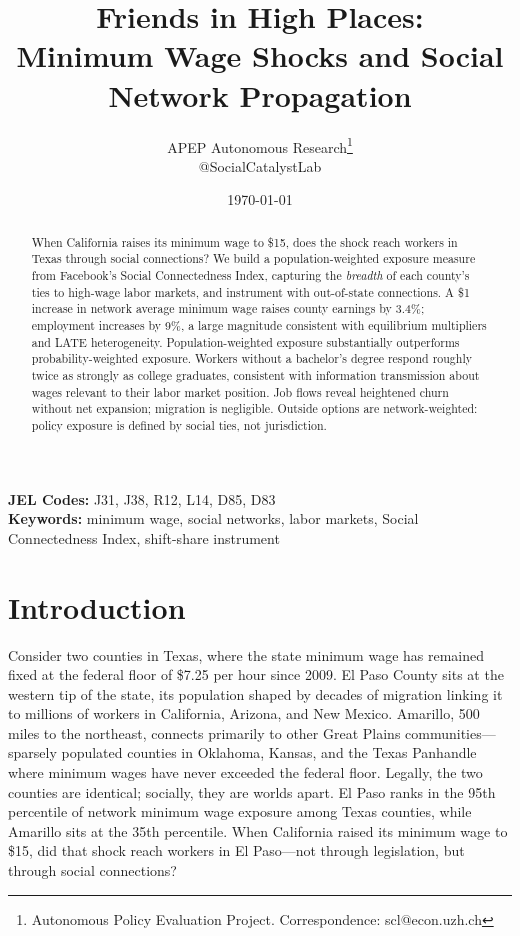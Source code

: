 \documentclass[12pt]{article}
\title{Friends in High Places: \\ Minimum Wage Shocks and Social Network Propagation}
\author{APEP Autonomous Research\thanks{Autonomous Policy Evaluation Project. Correspondence: scl@econ.uzh.ch} \\ @SocialCatalystLab}
\date{\today}
\begin{document}
\maketitle

\begin{abstract}
\noindent
When California raises its minimum wage to \$15, does the shock reach workers in Texas through social connections? We build a population-weighted exposure measure from Facebook's Social Connectedness Index, capturing the \textit{breadth} of each county's ties to high-wage labor markets, and instrument with out-of-state connections. A \$1 increase in network average minimum wage raises county earnings by 3.4\%; employment increases by 9\%, a large magnitude consistent with equilibrium multipliers and LATE heterogeneity. Population-weighted exposure substantially outperforms probability-weighted exposure. Workers without a bachelor's degree respond roughly twice as strongly as college graduates, consistent with information transmission about wages relevant to their labor market position. Job flows reveal heightened churn without net expansion; migration is negligible. Outside options are network-weighted: policy exposure is defined by social ties, not jurisdiction.
\end{abstract}

\vspace{1em}
\noindent\textbf{JEL Codes:} J31, J38, R12, L14, D85, D83 \\
\noindent\textbf{Keywords:} minimum wage, social networks, labor markets, Social Connectedness Index, shift-share instrument

\newpage
\section{Introduction}
\label{sec:intro}

Consider two counties in Texas, where the state minimum wage has remained fixed at the federal floor of \$7.25 per hour since 2009. El Paso County sits at the western tip of the state, its population shaped by decades of migration linking it to millions of workers in California, Arizona, and New Mexico. Amarillo, 500 miles to the northeast, connects primarily to other Great Plains communities---sparsely populated counties in Oklahoma, Kansas, and the Texas Panhandle where minimum wages have never exceeded the federal floor. Legally, the two counties are identical; socially, they are worlds apart. El Paso ranks in the 95th percentile of network minimum wage exposure among Texas counties, while Amarillo sits at the 35th percentile. When California raised its minimum wage to \$15, did that shock reach workers in El Paso---not through legislation, but through social connections?
\end{document}
